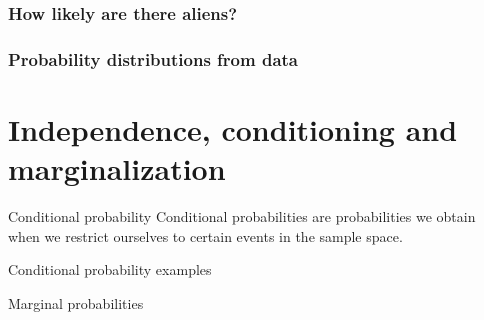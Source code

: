 \begin{frame}
\frametitle{How likely are there aliens?}

\end{frame}

\begin{frame}
\frametitle{Probability distributions from data}


\end{frame}


\section{Independence, conditioning and marginalization}
\begin{frame}{Conditional probability}
Conditional probabilities are probabilities we obtain when we restrict ourselves to certain events in the sample space.



\end{frame}

\begin{frame}{Conditional probability examples}



\end{frame}


\begin{frame}{Marginal probabilities}

\end{frame}




